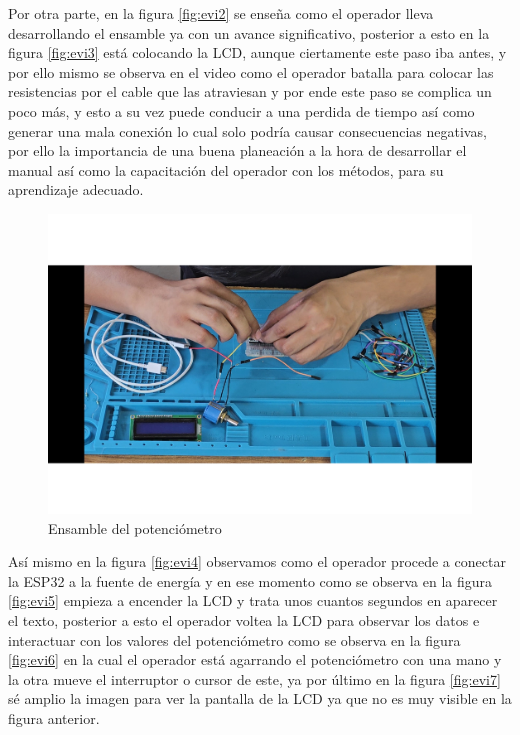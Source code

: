     
    
    Por otra parte, en la figura \ref{fig:evi2} se enseña como el operador lleva desarrollando el ensamble ya con un avance significativo, posterior a esto en la figura \ref{fig:evi3} está colocando la LCD, aunque ciertamente este paso iba antes, y por ello mismo se observa en el video como el operador batalla para colocar las resistencias por el cable que las atraviesan y por ende este paso se complica un poco más, y esto a su vez puede conducir a una perdida de tiempo así como generar una mala conexión lo cual solo podría causar consecuencias negativas, por ello la importancia de una buena planeación a la hora de desarrollar el manual así como la capacitación del operador con los métodos, para su aprendizaje adecuado.
    
    
       
    \begin{figure}[H]
        \centering
        \includegraphics[trim = {25mm 25mm 25mm 10mm},clip,scale=0.3]{22/Img/e2.pdf}
        \caption{Ensamble del potenciómetro}
        \label{fig:evi1}
    \end{figure}
    
    
    
     Así mismo en la figura \ref{fig:evi4} observamos como el operador procede a conectar la ESP32 a la fuente de energía y en ese momento como se observa en la figura \ref{fig:evi5} empieza a encender la LCD y trata unos cuantos segundos en aparecer el texto, posterior a esto el operador voltea la LCD para observar los datos e interactuar con los valores del potenciómetro como se observa en la figura \ref{fig:evi6} en la cual el operador está agarrando el potenciómetro con una mano y la otra mueve el interruptor o cursor de este, ya por último en la figura \ref{fig:evi7} sé amplio la imagen para ver la pantalla de la LCD  ya que no es muy visible en la figura anterior.
    
